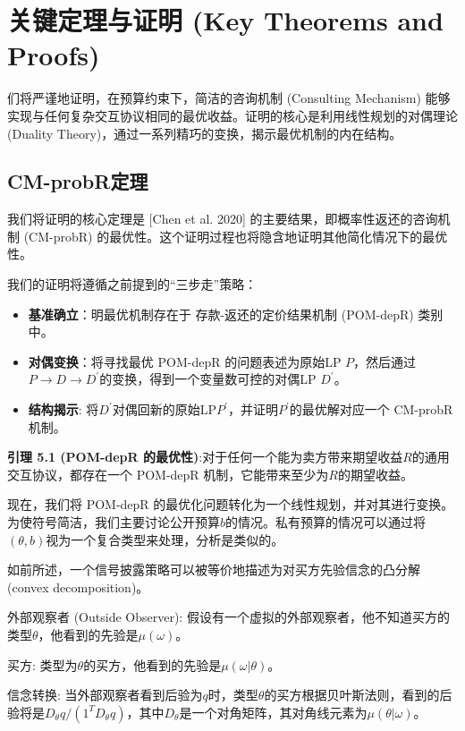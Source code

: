 \section{关键定理与证明 (Key Theorems and Proofs) }

们将严谨地证明，在预算约束下，简洁的咨询机制 (Consulting Mechanism) 能够实现与任何复杂交互协议相同的最优收益。证明的核心是利用线性规划的对偶理论 (Duality Theory)，通过一系列精巧的变换，揭示最优机制的内在结构。

\subsection{CM-probR定理}

我们将证明的核心定理是 [Chen et al. 2020] 的主要结果，即概率性返还的咨询机制 (CM-probR) 的最优性。这个证明过程也将隐含地证明其他简化情况下的最优性。

我们的证明将遵循之前提到的“三步走”策略：

\begin{itemize}
    \item \textbf{基准确立}：明最优机制存在于 存款-返还的定价结果机制 (POM-depR) 类别中。
    \item \textbf{对偶变换}：将寻找最优 POM-depR 的问题表述为原始LP $P$，然后通过$P\to D\to D^\prime$的变换，得到一个变量数可控的对偶LP $D^\prime$。
    \item \textbf{结构揭示}: 将$D^\prime$对偶回新的原始LP$P^\prime$，并证明$P^\prime$的最优解对应一个 CM-probR 机制。
\end{itemize}

\textbf{引理 5.1 (POM-depR 的最优性)}:对于任何一个能为卖方带来期望收益$R$的通用交互协议，都存在一个 POM-depR 机制，它能带来至少为$R$的期望收益。

现在，我们将 POM-depR 的最优化问题转化为一个线性规划，并对其进行变换。为使符号简洁，我们主要讨论公开预算$b$的情况。私有预算的情况可以通过将$(\theta,b)$视为一个复合类型来处理，分析是类似的。

如前所述，一个信号披露策略可以被等价地描述为对买方先验信念的凸分解 (convex decomposition)。

外部观察者 (Outside Observer): 假设有一个虚拟的外部观察者，他不知道买方的类型$\theta$，他看到的先验是$\mu(\omega)$。

买方: 类型为$\theta$的买方，他看到的先验是$\mu(\omega|\theta)$。

信念转换: 当外部观察者看到后验为$q$时，类型$\theta$的买方根据贝叶斯法则，看到的后验将是$D_\theta q / (1^T D_\theta q)$，其中$D_\theta$是一个对角矩阵，其对角线元素为$\mu(\theta|\omega)$。


